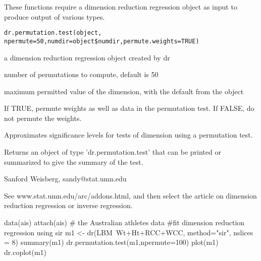 \begin{Description}\relax
These functions require a dimension reduction regression object as input to
produce output of various types.
\end{Description}
\begin{Usage}
\begin{verbatim}
dr.permutation.test(object, npermute=50,numdir=object$numdir,permute.weights=TRUE)

\end{verbatim}
\end{Usage}
\begin{Arguments}
\begin{ldescription}
\item[\code{object}] a dimension reduction regression object created by dr
\item[\code{npermute}] number of permutations to compute, default is 50
\item[\code{numdir}] maximum permitted value of the dimension, with the default from
the object
\item[\code{permute.weights}] If TRUE, permute weights as well as data in the
permutation test.  If FALSE, do not permute the weights.
\end{ldescription}
\end{Arguments}
\begin{Details}\relax
Approximates significance levels for tests of dimension using a permutation test.
\end{Details}
\begin{Value}
Returns an object of type 'dr.permutation.test' that can be printed or
summarized to give the summary of the test.
\end{Value}
\begin{Author}\relax
Sanford Weisberg, sandy@stat.umn.edu
\end{Author}
\begin{References}\relax
See www.stat.umn.edu/arc/addons.html, and then select the article
on dimension reduction regression or inverse regression.
\end{References}
\begin{SeeAlso}\relax
{}
\end{SeeAlso}
\begin{Examples}
\begin{ExampleCode}
data(ais)
attach(ais)  # the Australian athletes data
#fit dimension reduction regression using sir
m1 <- dr(LBM~Wt+Ht+RCC+WCC, method="sir", nslices = 8)
summary(m1)
dr.permutation.test(m1,npermute=100)
plot(m1)
dr.coplot(m1)
\end{ExampleCode}
\end{Examples}

